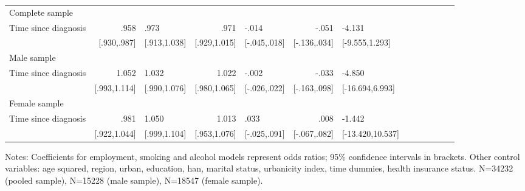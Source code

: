 \begin{table}[h]
\begin{adjustbox}{max width=\linewidth}
\begin{threeparttable}
{\begin{tabular}{l*{6}{D{.}{.}{-1}l}}
\addlinespace 
Complete sample &&&&&&\\                
Time since diagnosis&            .958&            .973&            .971&           -.014&           -.051&          -4.131\\
                &     [.930,.987]&    [.913,1.038]&    [.929,1.015]&    [-.045,.018]&    [-.136,.034]&  [-9.555,1.293]\\
\midrule
Male sample &&&&&&\\
Time since diagnosis&           1.052&           1.032&           1.022&           -.002&           -.033&          -4.850\\
                &    [.993,1.114]&    [.990,1.076]&    [.980,1.065]&    [-.026,.022]&    [-.163,.098]& [-16.694,6.993]\\
\midrule
Female sample &&&&&&\\
Time since diagnosis&            .981&           1.050&           1.013&            .033&            .008&          -1.442\\
                &    [.922,1.044]&    [.999,1.104]&    [.953,1.076]&    [-.025,.091]&    [-.067,.082]&[-13.420,10.537]\\                 
\bottomrule
\end{tabular}
\begin{tablenotes}
\item Notes: Coefficients for employment, smoking and alcohol models represent odds ratios;  95\% confidence intervals in brackets.
Other control variables: age squared, region, urban, education, han, marital status, urbanicity index, time dummies, health insurance status. N=34232 (pooled sample), N=15228 (male sample), N=18547 (female sample).
\end{tablenotes}
}
\end{threeparttable}
\end{adjustbox}
\end{table}



